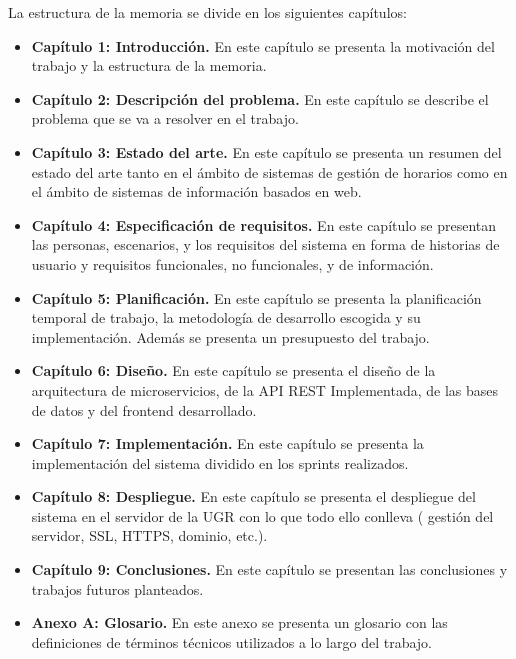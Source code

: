 La estructura de la memoria se divide en los siguientes capítulos:

\begin{itemize}
    \item \textbf{Capítulo 1: Introducción.} En este capítulo se presenta la motivación del trabajo y la estructura de la memoria.
    \item \textbf{Capítulo 2: Descripción del problema.} En este capítulo se describe el problema que se va a resolver en el trabajo.
    \item \textbf{Capítulo 3: Estado del arte.} En este capítulo se presenta un resumen del estado del arte tanto en el ámbito de sistemas de gestión de horarios como en el ámbito de sistemas de información basados en web.
    \item \textbf{Capítulo 4: Especificación de requisitos.} En este capítulo se presentan las personas, escenarios, y los requisitos del sistema en forma de historias de usuario y requisitos funcionales, no funcionales, y de información.
    \item \textbf{Capítulo 5: Planificación.} En este capítulo se presenta la planificación temporal de trabajo, la metodología de desarrollo escogida y su implementación. Además se presenta un presupuesto del trabajo.
    \item \textbf{Capítulo 6: Diseño.} En este capítulo se presenta el diseño de la arquitectura de microservicios, de la API REST Implementada, de las bases de datos y del frontend desarrollado.
    \item \textbf{Capítulo 7: Implementación.} En este capítulo se presenta la implementación del sistema dividido en los sprints realizados.
    \item \textbf{Capítulo 8: Despliegue.} En este capítulo se presenta el despliegue del sistema en el servidor de la UGR con lo que todo ello conlleva ( gestión del servidor, SSL, HTTPS, dominio, etc.).
    \item \textbf{Capítulo 9: Conclusiones.} En este capítulo se presentan las conclusiones y trabajos futuros planteados.
    \item \textbf{Anexo A: Glosario.} En este anexo se presenta un glosario con las definiciones de términos técnicos utilizados a lo largo del trabajo.
\end{itemize}